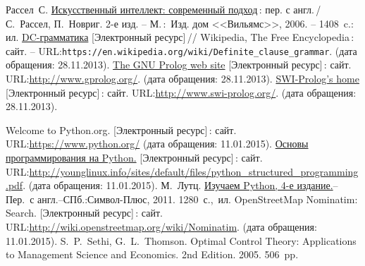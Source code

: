 \documentclass[a4paper,14pt, openany, twoside, final]{extbook} %
\def\emphbib#1{#1}
\begin{document}
\begin{thebibliography}{99}
 Рассел~С. \href{http://www.aiportal.ru/downloads/books/ai-modern-approach-2-edition-by-rassel-norvig.html}{Искусственный интеллект: современный подход}\,{}: пер. с англ.\,{}/ С.~Рассел, П.~Новриг. 2-е изд. -- М.\,:~Изд. дом <<Вильямс>>, 2006. -- 1408~c.: ил.
 \emphbib{\href{https://en.wikipedia.org/wiki/Definite_clause_grammar}{DC-грамматика}} [Электронный ресурс]\,{}// Wikipedia, The Free Encyclopedia\,{}: сайт. -- URL:\texttt{https://en.wikipedia.org/wiki/Definite\_clause\linebreak\_grammar}. (дата обращения: 28.11.2013).
 \emphbib{\href{http://www.gprolog.org/}{The GNU Prolog web site} [Электронный ресурс]\,{}: сайт}. URL:\url{http://www.gprolog.org/}. (дата обращения: 28.11.2013).
 \emphbib{\href{http://www.swi-prolog.org/}{SWI-Prolog's home} [Электронный ресурс]\,{}: сайт}. URL:\url{http://www.swi-prolog.org/}. (дата обращения: 28.11.2013).

 Welcome to Python.org.  [Электронный ресурс]\,{}: сайт. URL:\url{https://www.python.org/} (дата обращения: 11.01.2015).
 \href{http://younglinux.info/sites/default/files/python_structured_programming.pdf}{Основы программирования на Python.}  [Электронный ресурс]\,{}: сайт. URL:\url{http://younglinux.info/sites/default/files/python_structured_programming.pdf}. (дата обращения: 11.01.2015).
М.~Лутц.  \href{https://vk.com/doc10903696_196246835?hash=4b80f3cf914c7d65dd&dl=f90686bee18e565271}{Изучаем Python, 4-е издание.}-- Пер.~с англ.--СПб.:Символ-Плюс, 2011. 1280~с.,~ил.
 OpenStreetMap Nominatim: Search.  [Электронный ресурс]\,{}: сайт. URL:\url{http://wiki.openstreetmap.org/wiki/Nominatim}. (дата обращения: 11.01.2015).
S.~P.~Sethi, G.~L.~Thomson. Optimal Control Theory: Applications to Management Science and Economics. 2nd Edition. 2005. 506~pp.
\end{thebibliography}
\label{lastpage}
\newpage
\thispagestyle{empty}
\mbox{}

\vfill\vfill\vfill\vfill
\end{document}
